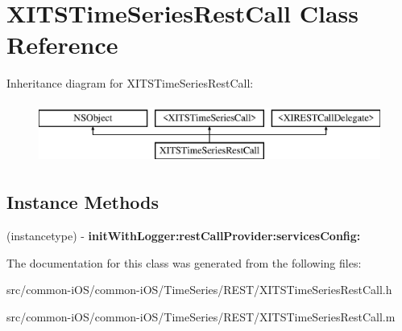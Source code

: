 \hypertarget{interface_x_i_t_s_time_series_rest_call}{}\section{X\+I\+T\+S\+Time\+Series\+Rest\+Call Class Reference}
\label{interface_x_i_t_s_time_series_rest_call}
Inheritance diagram for X\+I\+T\+S\+Time\+Series\+Rest\+Call\+:\begin{figure}[H]
\begin{center}
\leavevmode
\includegraphics[height=2.000000cm]{interface_x_i_t_s_time_series_rest_call}
\end{center}
\end{figure}
\subsection*{Instance Methods}
\begin{DoxyCompactItemize}
\item 
\hypertarget{interface_x_i_t_s_time_series_rest_call_a996f7d4ca27da930b306cd21e1bd092d}{}\label{interface_x_i_t_s_time_series_rest_call_a996f7d4ca27da930b306cd21e1bd092d} 
(instancetype) -\/ {\bfseries init\+With\+Logger\+:rest\+Call\+Provider\+:services\+Config\+:}
\end{DoxyCompactItemize}


The documentation for this class was generated from the following files\+:\begin{DoxyCompactItemize}
\item 
src/common-\/i\+O\+S/common-\/i\+O\+S/\+Time\+Series/\+R\+E\+S\+T/X\+I\+T\+S\+Time\+Series\+Rest\+Call.\+h\item 
src/common-\/i\+O\+S/common-\/i\+O\+S/\+Time\+Series/\+R\+E\+S\+T/X\+I\+T\+S\+Time\+Series\+Rest\+Call.\+m\end{DoxyCompactItemize}
